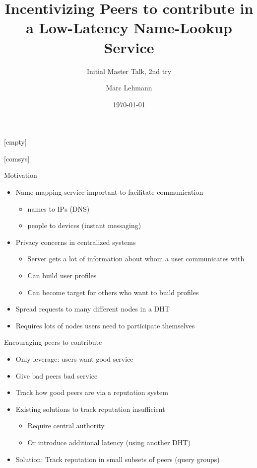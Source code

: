 \documentclass[presentation,english,usenames,dvipsnames]{beamer}
\title[Peer-to-Peer Incentives]{Incentivizing Peers to contribute in a
Low-Latency Name-Lookup Service}
\author{Marc Lehmann}
\subtitle{Initial Master Talk, 2nd try}
\date{\today}
\begin{document}
[empty]
\begin{frame}
  \titlepage
\end{frame}

[comsys]

\begin{frame}{Motivation}
  \begin{itemize}
    \item Name-mapping service important to facilitate communication
    \begin{itemize}
      \item names to IPs (DNS)
      \item people to devices (instant messaging)
    \end{itemize}
    \item Privacy concerns in centralized systems
    \begin{itemize}
      \item Server gets a lot of information about whom a user communicates with
      \item Can build user profiles
      \item Can become target for others who want to build profiles
    \end{itemize}
    \item Spread requests to many different nodes in a DHT
    \item Requires lots of nodes \rightarrow users need to participate
          themselves
  \end{itemize}
\end{frame}

\begin{frame}{Encouraging peers to contribute}
  \begin{itemize}
    \item Only leverage: users want good service
    \item Give bad peers bad service
    \item Track how good peers are via a reputation system
    \item Existing solutions to track reputation insufficient
    \begin{itemize}
      \item Require central authority
      \item Or introduce additional latency (using another DHT)
    \end{itemize}
    \item Solution: Track reputation in small subsets of peers (query groups)
  \end{itemize}
\end{frame}
\end{document}

